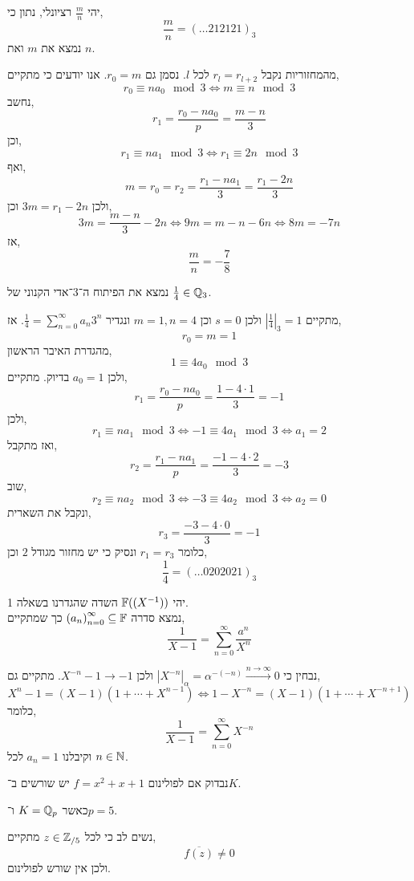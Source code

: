 \question{}
יהי $\frac{m}{n}$ רציונלי, נתון כי,
\[
	\frac{m}{n}
	= {(\ldots 212121)}_3
\]
נמצא את $m$ ואת $n$.
\begin{solution}
	מהמחזוריות נקבל $r_l = r_{l + 2}$ לכל $l$.
	נסמן גם $r_0 = m$.
	אנו יודעים כי מתקיים,
	\[
		r_0 \equiv n a_0 \mod 3
		\iff m \equiv n \mod 3
	\]
	נחשב,
	\[
		r_1
		= \frac{r_0 - n a_0}{p}
		= \frac{m - n}{3}
	\]
	וכן,
	\[
		r_1 \equiv n a_1 \mod 3
		\iff r_1 \equiv 2 n \mod 3
	\]
	ואף,
	\[
		m
		= r_0
		= r_2
		= \frac{r_1 - n a_1}{3}
		= \frac{r_1 - 2n}{3}
	\]
	ולכן $3m = r_1 - 2n$ וכן,
	\[
		3m = \frac{m - n}{3} - 2n
		\iff 9m = m - n - 6n
		\iff 8m = -7n
	\]
	אז,
	\[
		\frac{m}{n}
		= -\frac{7}{8}
	\]
\end{solution}

\question{}
נמצא את הפיתוח ה־$3$־אדי הקנוני של $\frac{1}{4} \in \mathbb{Q}_3$.
\begin{solution}
	מתקיים $|\frac{1}{4}|_3 = 1$ ולכן $s = 0$ וכן $m = 1, n = 4$ ונגדיר $\frac{1}{4} = \sum_{n = 0}^\infty a_n 3^n$.
	אז,
	\[
		r_0
		= m
		= 1
	\]
	מהגדרת האיבר הראשון,
	\[
		1 \equiv 4 a_0 \mod 3
	\]
	ולכן $a_0 = 1$ בדיוק.
	מתקיים,
	\[
		r_1
		= \frac{r_0 - n a_0}{p}
		= \frac{1 - 4 \cdot 1}{3}
		= -1
	\]
	ולכן,
	\[
		r_1 \equiv n a_1 \mod 3
		\iff -1 \equiv 4 a_1 \mod 3
		\iff a_1 = 2
	\]
	ואז מתקבל,
	\[
		r_2
		= \frac{r_1 - n a_1}{p}
		= \frac{-1 - 4 \cdot 2}{3}
		= -3
	\]
	שוב,
	\[
		r_2 \equiv n a_2 \mod 3
		\iff -3 \equiv 4 a_2 \mod 3
		\iff a_2 = 0
	\]
	ונקבל את השארית,
	\[
		r_3
		= \frac{-3 - 4 \cdot 0}{3}
		= -1
	\]
	כלומר $r_1 = r_3$ ונסיק כי יש מחזור מגודל $2$ וכן,
	\[
		\frac{1}{4}
		= {(\ldots 0202021)}_3
	\]
\end{solution}

\question{}
יהי $\mathbb{F}((X^{-1}))$ השדה שהגדרנו בשאלה 1. \\
נמצא סדרה ${(a_n)}_{n = 0}^{\infty} \subseteq \mathbb{F}$ כך שמתקיים,
\[
	\frac{1}{X - 1} = \sum_{n = 0}^\infty \frac{a^n}{X^n}
\]
\begin{solution}
	נבחין כי $|X^{-n}|_{\alpha} = \alpha^{-(-n)} \xrightarrow{n \to \infty} 0$ ולכן $X^{-n} - 1 \to -1$.
	מתקיים גם,
	\[
		X^n - 1
		= (X - 1)(1 + \cdots + X^{n - 1})
		\iff 1 - X^{-n}
		= (X - 1)(1 + \cdots + X^{-n + 1})
	\]
	כלומר,
	\[
		\frac{1}{X - 1}
		= \sum_{n = 0}^\infty X^{-n}
	\]
	וקיבלנו $a_n = 1$ לכל $n \in \mathbb{N}$.
\end{solution}

\question{}
נבדוק אם לפולינום $f = x^2 + x + 1$ יש שורשים ב־$K$.

\subquestion{}
כאשר $K = \mathbb{Q}_p$ ו־$p = 5$.
\begin{solution}
	נשים לב כי לכל $z \in \mathbb{Z}_{/ 5}$ מתקיים,
	\[
		\overline{f(z)} \ne 0
	\]
	ולכן אין שורש לפולינום.
\end{solution}

